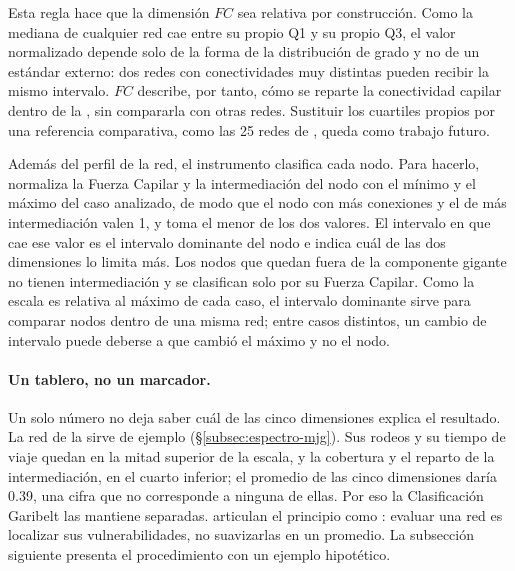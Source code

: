 Esta regla hace que la dimensión $FC$ sea relativa por construcción. Como la
mediana de cualquier red cae entre su propio Q1 y su propio Q3, el valor
normalizado depende solo de la forma de la distribución de grado y no de un
estándar externo: dos redes con conectividades muy distintas pueden recibir la
mismo intervalo. $FC$ describe, por tanto, cómo se reparte la conectividad capilar
dentro de la \zmvm{}, sin compararla con otras redes. Sustituir los cuartiles
propios por una referencia comparativa, como las 25 redes de \citet{kujala2018},
queda como trabajo futuro.

Además del perfil de la red, el instrumento clasifica cada nodo. Para hacerlo,
normaliza la Fuerza Capilar y la intermediación del nodo con el mínimo y el
máximo del caso analizado, de modo que el nodo con más conexiones y el de más
intermediación valen 1, y toma el menor de los dos valores. El intervalo en que
cae ese valor es el intervalo dominante del nodo e indica cuál de las dos
dimensiones lo limita más. Los nodos que quedan fuera de la componente gigante
no tienen intermediación y se clasifican solo por su Fuerza Capilar. Como la
escala es relativa al máximo de cada caso, el intervalo dominante sirve para
comparar nodos dentro de una misma red; entre casos distintos, un cambio de
intervalo puede deberse a que cambió el máximo y no el nodo.

\paragraph{Un tablero, no un marcador.}
\label{subsubsec:garibelt-tablero}

Un solo número no deja saber cuál de las cinco dimensiones explica el
resultado. La red de la \zmvm{} sirve de ejemplo (§\ref{subsec:espectro-mjg}).
Sus rodeos y su tiempo de viaje quedan en la mitad superior de la escala, y la
cobertura y el reparto de la intermediación, en el cuarto inferior; el
promedio de las cinco dimensiones daría 0.39, una cifra que no corresponde a
ninguna de ellas. Por eso la Clasificación Garibelt las mantiene separadas.
\citet{deng2023} articulan el principio como : evaluar
una red es localizar sus vulnerabilidades, no suavizarlas en un promedio. La
subsección siguiente presenta el procedimiento con un ejemplo hipotético.
